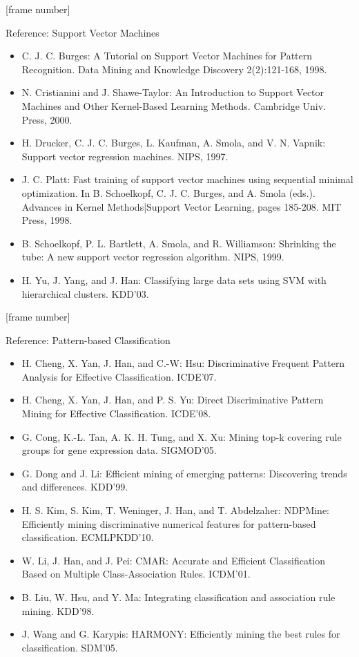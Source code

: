 \documentclass[aspectratio=169,t,table]{beamer}
\begin{document}
  {
    [frame number]
    \begin{frame}{Reference: Support Vector Machines}
      \begin{itemize}
        \item C. J. C. Burges: A Tutorial on Support Vector Machines for Pattern Recognition. Data Mining and Knowledge Discovery 2(2):121-168, 1998.
        \item N. Cristianini and J. Shawe-Taylor: An Introduction to Support Vector Machines and Other Kernel-Based Learning Methods. Cambridge Univ. Press, 2000.
        \item H. Drucker, C. J. C. Burges, L. Kaufman, A. Smola, and V. N. Vapnik: Support vector regression machines. NIPS, 1997.
        \item J. C. Platt: Fast training of support vector machines using sequential minimal optimization. In B. Schoelkopf, C. J. C. Burges, and A. Smola (eds.). Advances in Kernel Methods|Support Vector Learning, pages 185-208. MIT Press, 1998.
        \item B. Schoelkopf, P. L. Bartlett, A. Smola, and R. Williamson: Shrinking the tube: A new support vector regression algorithm. NIPS, 1999.
        \item H. Yu, J. Yang, and J. Han: Classifying large data sets using SVM with hierarchical clusters. KDD'03.
      \end{itemize}
    \end{frame}
  }

  {
    [frame number]
    \begin{frame}{Reference: Pattern-based Classification}
      \begin{itemize}
        \item H. Cheng, X. Yan, J. Han, and C.-W: Hsu: Discriminative Frequent Pattern Analysis for Effective Classification. ICDE'07.
        \item H. Cheng, X. Yan, J. Han, and P. S. Yu: Direct Discriminative Pattern Mining for Effective Classification. ICDE'08.
        \item G. Cong, K.-L. Tan, A. K. H. Tung, and X. Xu: Mining top-k covering rule groups for gene expression data. SIGMOD'05.
        \item G. Dong and J. Li: Efficient mining of emerging patterns: Discovering trends and differences. KDD'99.
        \item H. S. Kim, S. Kim, T. Weninger, J. Han, and T. Abdelzaher: NDPMine: Efficiently mining discriminative numerical features for pattern-based classification. ECMLPKDD'10.
        \item W. Li, J. Han, and J. Pei: CMAR: Accurate and Efficient Classification Based on Multiple Class-Association Rules. ICDM'01.
        \item B. Liu, W. Hsu, and Y. Ma: Integrating classification and association rule mining. KDD'98.
        \item J. Wang and G. Karypis: HARMONY: Efficiently mining the best rules for classification. SDM'05.
      \end{itemize}
    \end{frame}
  }
\end{document}
